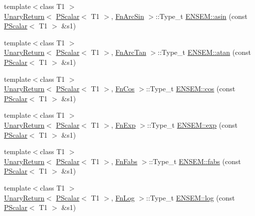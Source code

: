 \begin{DoxyCompactItemize}
\item 
{\footnotesize template$<$class T1 $>$ }\\\mbox{\hyperlink{structENSEM_1_1UnaryReturn}{Unary\+Return}}$<$ \mbox{\hyperlink{classENSEM_1_1PScalar}{P\+Scalar}}$<$ T1 $>$, \mbox{\hyperlink{structENSEM_1_1FnArcSin}{Fn\+Arc\+Sin}} $>$\+::Type\+\_\+t \mbox{\hyperlink{group__primscalar_ga66e19f88731b0ca161e7ecb7a3d4ea94}{E\+N\+S\+E\+M\+::asin}} (const \mbox{\hyperlink{classENSEM_1_1PScalar}{P\+Scalar}}$<$ T1 $>$ \&s1)
\item 
{\footnotesize template$<$class T1 $>$ }\\\mbox{\hyperlink{structENSEM_1_1UnaryReturn}{Unary\+Return}}$<$ \mbox{\hyperlink{classENSEM_1_1PScalar}{P\+Scalar}}$<$ T1 $>$, \mbox{\hyperlink{structENSEM_1_1FnArcTan}{Fn\+Arc\+Tan}} $>$\+::Type\+\_\+t \mbox{\hyperlink{group__primscalar_gad0db281b26948d9de5a2de123a357fe5}{E\+N\+S\+E\+M\+::atan}} (const \mbox{\hyperlink{classENSEM_1_1PScalar}{P\+Scalar}}$<$ T1 $>$ \&s1)
\item 
{\footnotesize template$<$class T1 $>$ }\\\mbox{\hyperlink{structENSEM_1_1UnaryReturn}{Unary\+Return}}$<$ \mbox{\hyperlink{classENSEM_1_1PScalar}{P\+Scalar}}$<$ T1 $>$, \mbox{\hyperlink{structENSEM_1_1FnCos}{Fn\+Cos}} $>$\+::Type\+\_\+t \mbox{\hyperlink{group__primscalar_ga0d6f04344bee0fa65f96047c4c9e2fa3}{E\+N\+S\+E\+M\+::cos}} (const \mbox{\hyperlink{classENSEM_1_1PScalar}{P\+Scalar}}$<$ T1 $>$ \&s1)
\item 
{\footnotesize template$<$class T1 $>$ }\\\mbox{\hyperlink{structENSEM_1_1UnaryReturn}{Unary\+Return}}$<$ \mbox{\hyperlink{classENSEM_1_1PScalar}{P\+Scalar}}$<$ T1 $>$, \mbox{\hyperlink{structENSEM_1_1FnExp}{Fn\+Exp}} $>$\+::Type\+\_\+t \mbox{\hyperlink{group__primscalar_ga82558f162d1959eca11c01ad753fc3a1}{E\+N\+S\+E\+M\+::exp}} (const \mbox{\hyperlink{classENSEM_1_1PScalar}{P\+Scalar}}$<$ T1 $>$ \&s1)
\item 
{\footnotesize template$<$class T1 $>$ }\\\mbox{\hyperlink{structENSEM_1_1UnaryReturn}{Unary\+Return}}$<$ \mbox{\hyperlink{classENSEM_1_1PScalar}{P\+Scalar}}$<$ T1 $>$, \mbox{\hyperlink{structENSEM_1_1FnFabs}{Fn\+Fabs}} $>$\+::Type\+\_\+t \mbox{\hyperlink{group__primscalar_ga974d25e3b2bee6a839ad06b019932122}{E\+N\+S\+E\+M\+::fabs}} (const \mbox{\hyperlink{classENSEM_1_1PScalar}{P\+Scalar}}$<$ T1 $>$ \&s1)
\item 
{\footnotesize template$<$class T1 $>$ }\\\mbox{\hyperlink{structENSEM_1_1UnaryReturn}{Unary\+Return}}$<$ \mbox{\hyperlink{classENSEM_1_1PScalar}{P\+Scalar}}$<$ T1 $>$, \mbox{\hyperlink{structENSEM_1_1FnLog}{Fn\+Log}} $>$\+::Type\+\_\+t \mbox{\hyperlink{group__primscalar_ga4793657c8e42b217f973ede3c83b71d7}{E\+N\+S\+E\+M\+::log}} (const \mbox{\hyperlink{classENSEM_1_1PScalar}{P\+Scalar}}$<$ T1 $>$ \&s1)

\end{DoxyCompactItemize}
